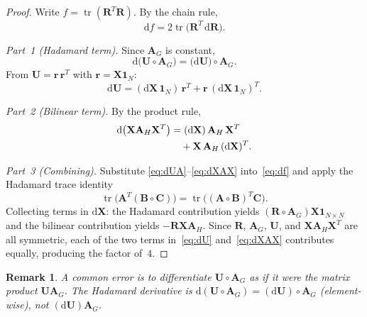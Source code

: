 \documentclass[conference]{IEEEtran}
\newtheorem{remark}{Remark}
\begin{document}
\begin{proof}
Write $f = \operatorname{tr}(\mathbf{R}^{T}\mathbf{R})$.
By the chain rule,
\begin{equation}
\mathrm{d}f = 2\operatorname{tr}\!\bigl(\mathbf{R}^{T}\,\mathrm{d}\mathbf{R}\bigr).
\label{eq:df}
\end{equation}

\emph{Part~1 (Hadamard term).}
Since $\mathbf{A}_G$ is constant,
\begin{equation}
\mathrm{d}\bigl(\mathbf{U} \circ \mathbf{A}_G\bigr)
  = \bigl(\mathrm{d}\mathbf{U}\bigr) \circ \mathbf{A}_G.
\label{eq:dUA}
\end{equation}
From $\mathbf{U} = \mathbf{r}\,\mathbf{r}^{T}$
with $\mathbf{r} = \mathbf{X}\mathbf{1}_N$:
\begin{equation}
\mathrm{d}\mathbf{U}
  = (\mathrm{d}\mathbf{X}\,\mathbf{1}_N)\,\mathbf{r}^{T}
  + \mathbf{r}\,(\mathrm{d}\mathbf{X}\,\mathbf{1}_N)^{T}.
\label{eq:dU}
\end{equation}

\emph{Part~2 (Bilinear term).}
By the product rule,
\begin{align}
\mathrm{d}\bigl(\mathbf{X}\mathbf{A}_H\mathbf{X}^{T}\bigr)
  &= (\mathrm{d}\mathbf{X})\,\mathbf{A}_H\,\mathbf{X}^{T}
\notag\\
  &\quad+ \mathbf{X}\,\mathbf{A}_H\,(\mathrm{d}\mathbf{X})^{T}.
\label{eq:dXAX}
\end{align}

\emph{Part~3 (Combining).}
Substitute \eqref{eq:dUA}--\eqref{eq:dXAX} into~\eqref{eq:df}
and apply the Hadamard trace identity
\begin{equation*}
\operatorname{tr}\!\bigl(\mathbf{A}^{T}(\mathbf{B}\!\circ\!\mathbf{C})\bigr)
= \operatorname{tr}\!\bigl((\mathbf{A}\!\circ\!\mathbf{B})^{T}\mathbf{C}\bigr).
\end{equation*}
Collecting terms in $\mathrm{d}\mathbf{X}$: the Hadamard contribution
yields $(\mathbf{R}\!\circ\!\mathbf{A}_G)\mathbf{X}\mathbf{1}_{N\times N}$
and the bilinear contribution yields $-\mathbf{R}\mathbf{X}\mathbf{A}_H$.
Since $\mathbf{R}$, $\mathbf{A}_G$, $\mathbf{U}$, and
$\mathbf{X}\mathbf{A}_H\mathbf{X}^{T}$ are all symmetric,
each of the two terms in~\eqref{eq:dU} and~\eqref{eq:dXAX}
contributes equally, producing the factor of~$4$.
\end{proof}

\begin{remark}
A common error is to differentiate $\mathbf{U} \circ \mathbf{A}_G$
as if it were the matrix product $\mathbf{U}\mathbf{A}_G$.
The Hadamard derivative is
$\mathrm{d}(\mathbf{U}\!\circ\!\mathbf{A}_G) = (\mathrm{d}\mathbf{U})\!\circ\!\mathbf{A}_G$
(element-wise), \emph{not} $(\mathrm{d}\mathbf{U})\mathbf{A}_G$.
\end{remark}
\end{document}
